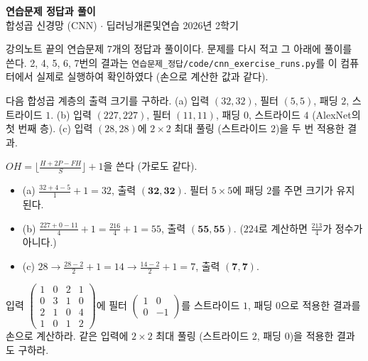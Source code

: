 \documentclass[11pt,a4paper]{article}
\begin{document}
\begin{center}
{\LARGE\bfseries 연습문제 정답과 풀이}\\[0.35em]
{\large 합성곱 신경망 (CNN) $\cdot$ 딥러닝개론및연습 2026년 2학기}
\end{center}

강의노트 끝의 연습문제 7개의 정답과 풀이이다. 문제를 다시 적고 그 아래에 풀이를 쓴다.
2, 4, 5, 6, 7번의 결과는 \texttt{연습문제\_정답/code/cnn\_exercise\_runs.py}를 이 컴퓨터에서 실제로 실행하여 확인하였다
(손으로 계산한 값과 같다).

\begin{problems}

\item 다음 합성곱 계층의 출력 크기를 구하라.
(a) 입력 $(32,32)$, 필터 $(5,5)$, 패딩 $2$, 스트라이드 $1$.
(b) 입력 $(227,227)$, 필터 $(11,11)$, 패딩 $0$, 스트라이드 $4$ (AlexNet의 첫 번째 층).
(c) 입력 $(28,28)$에 $2\times2$ 최대 풀링 (스트라이드 $2$)을 두 번 적용한 결과.

\begin{sol}
$OH=\bigl\lfloor\frac{H+2P-FH}{S}\bigr\rfloor+1$을 쓴다 (가로도 같다).
\begin{itemize}[leftmargin=1.5em,itemsep=2pt]
\item (a) $\frac{32+4-5}{1}+1=32$, 출력 $\mathbf{(32,32)}$. 필터 $5\times5$에 패딩 $2$를 주면 크기가 유지된다.
\item (b) $\frac{227+0-11}{4}+1=\frac{216}{4}+1=55$, 출력 $\mathbf{(55,55)}$. ($224$로 계산하면 $\frac{213}{4}$가 정수가 아니다.)
\item (c) $28\to\frac{28-2}{2}+1=14\to\frac{14-2}{2}+1=7$, 출력 $\mathbf{(7,7)}$.
\end{itemize}
\end{sol}

\item 입력 $\begin{pmatrix}1&0&2&1\\0&3&1&0\\2&1&0&4\\1&0&1&2\end{pmatrix}$에
필터 $\begin{pmatrix}1&0\\0&-1\end{pmatrix}$를 스트라이드 $1$, 패딩 $0$으로 적용한 결과를 손으로 계산하라.
같은 입력에 $2\times2$ 최대 풀링 (스트라이드 $2$, 패딩 $0$)을 적용한 결과도 구하라.


\end{problems}
\end{document}
